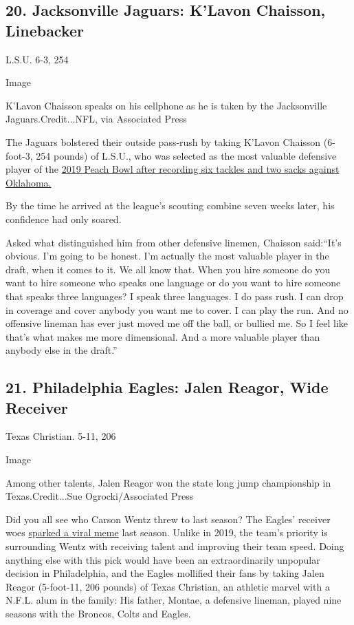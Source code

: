 \hypertarget{20-jacksonville-jaguars-klavon-chaisson-linebacker}{%
\subsection{20. Jacksonville Jaguars: K'Lavon Chaisson,
Linebacker}\label{20-jacksonville-jaguars-klavon-chaisson-linebacker}}

L.S.U. 6-3, 254

Image

K'Lavon Chaisson speaks on his cellphone as he is taken by the
Jacksonville Jaguars.Credit...NFL, via Associated Press

The Jaguars bolstered their outside pass-rush by taking K'Lavon Chaisson
(6-foot-3, 254 pounds) of L.S.U., who was selected as the most valuable
defensive player of the
\href{https://www.nytimes3xbfgragh.onion/2019/12/27/sports/ncaafootball/lsu-oklahoma-college-football-playoff.html}{2019
Peach Bowl after recording six tackles and two sacks against Oklahoma.}

By the time he arrived at the league's scouting combine seven weeks
later, his confidence had only soared.

Asked what distinguished him from other defensive linemen, Chaisson
said:``It's obvious. I'm going to be honest. I'm actually the most
valuable player in the draft, when it comes to it. We all know that.
When you hire someone do you want to hire someone who speaks one
language or do you want to hire someone that speaks three languages? I
speak three languages. I do pass rush. I can drop in coverage and cover
anybody you want me to cover. I can play the run. And no offensive
lineman has ever just moved me off the ball, or bullied me. So I feel
like that's what makes me more dimensional. And a more valuable player
than anybody else in the draft.''

\hypertarget{21-philadelphia-eagles-jalen-reagor-wide-receiver}{%
\subsection{21. Philadelphia Eagles: Jalen Reagor, Wide
Receiver}\label{21-philadelphia-eagles-jalen-reagor-wide-receiver}}

Texas Christian. 5-11, 206

Image

Among other talents, Jalen Reagor won the state long jump championship
in Texas.Credit...Sue Ogrocki/Associated Press

Did you all see who Carson Wentz threw to last season? The Eagles'
receiver woes
\href{https://www.nytimes3xbfgragh.onion/2019/10/02/sports/football/unlike-agholor-drops-eagles.html}{sparked
a viral meme} last season. Unlike in 2019, the team's priority is
surrounding Wentz with receiving talent and improving their team speed.
Doing anything else with this pick would have been an extraordinarily
unpopular decision in Philadelphia, and the Eagles mollified their fans
by taking Jalen Reagor (5-foot-11, 206 pounds) of Texas Christian, an
athletic marvel with a N.F.L. alum in the family: His father, Montae, a
defensive lineman, played nine seasons with the Broncos, Colts and
Eagles.

